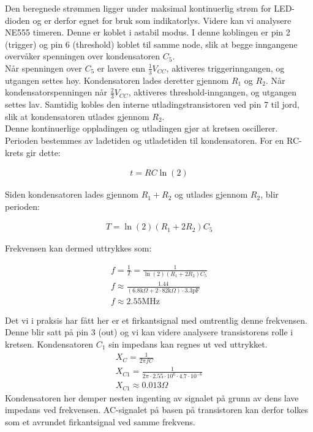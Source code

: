 \noindent
Den beregnede strømmen ligger under maksimal kontinuerlig strøm for LED-dioden og er derfor egnet for bruk som indikatorlys. Videre kan vi analysere NE555 timeren. Denne er koblet i astabil modus. I denne koblingen er pin 2 (trigger) og pin 6 (threshold) koblet til samme node, slik at begge inngangene overvåker spenningen over kondensatoren $C_5$.
\\[1em]
Når spenningen over $C_5$ er lavere enn $\frac{1}{3}V_{CC}$, aktiveres triggerinngangen, og utgangen settes høy. Kondensatoren lades deretter gjennom $R_1$ og $R_2$. Når kondensatorspenningen når $\frac{2}{3}V_{CC}$, aktiveres threshold-inngangen, og utgangen settes lav. Samtidig kobles den interne utladingstransistoren ved pin 7 til jord, slik at kondensatoren utlades gjennom $R_2$.
\\[1em]
Denne kontinuerlige oppladingen og utladingen gjør at kretsen oscillerer. Perioden bestemmes av ladetiden og utladetiden til kondensatoren. For en RC-krets gir dette:

\begin{gather*}
    t = RC \ln(2)
\end{gather*}

\noindent
Siden kondensatoren lades gjennom $R_1 + R_2$ og utlades gjennom $R_2$, blir perioden:

\begin{gather*}
    T = \ln(2)(R_1 + 2R_2)C_5
\end{gather*}

\noindent
Frekvensen kan dermed uttrykkes som:

\begin{gather*}
    f = \frac{1}{T} = \frac{1}{\ln(2)(R_1 + 2R_2)C_5} \\[0.5em]
    f \approx \frac{1.44}{(6.8\text{k}\Omega + 2 \cdot 82\text{k}\Omega)\cdot 3.3\text{pF}} \\[0.5em]
    f  \approx 2.55\text{MHz}
\end{gather*}

\noindent
Det vi i praksis har fått her er et firkantsignal med omtrentlig denne frekvensen. Denne blir satt på pin 3 (out) og vi kan videre analysere transistorens rolle i kretsen. Kondensatoren $C_1$ sin impedans kan regnes ut ved uttrykket.
\begin{gather*}
    X_C = \frac{1}{2 \pi f C} \\
    X_{C1} = \frac{1}{2 \pi \cdot 2.55 \cdot 10^6 \cdot 4.7 \cdot 10^{-6}} \\
    X_{C1} \approx 0.013\Omega
\end{gather*}
\noindent
Kondensatoren her demper nesten ingenting av signalet på grunn av dens lave impedans ved frekvensen. AC-signalet på basen på transistoren kan derfor tolkes som et avrundet firkantsignal ved samme frekvens.


